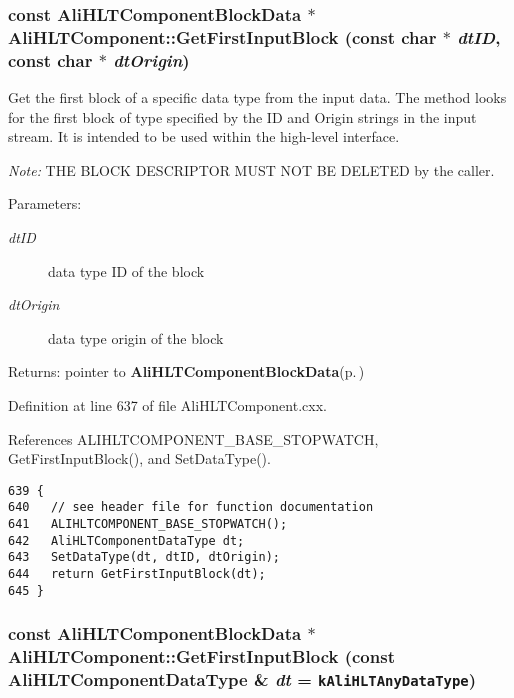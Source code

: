 \subsubsection{\setlength{\rightskip}{0pt plus 5cm}const {\bf Ali\-HLTComponent\-Block\-Data} $\ast$ Ali\-HLTComponent::Get\-First\-Input\-Block (const char $\ast$ {\em dt\-ID}, const char $\ast$ {\em dt\-Origin})\hspace{0.3cm}{\tt  [protected]}}\label{classAliHLTComponent_b19}


Get the first block of a specific data type from the input data. The method looks for the first block of type specified by the ID and Origin strings in the input stream. It is intended to be used within the high-level interface.\par
 {\em Note:\/} THE BLOCK DESCRIPTOR MUST NOT BE DELETED by the caller. \begin{Desc}
\item[Parameters:]
\begin{description}
\item[{\em dt\-ID}]data type ID of the block \item[{\em dt\-Origin}]data type origin of the block \end{description}
\end{Desc}
\begin{Desc}
\item[Returns:]pointer to {\bf Ali\-HLTComponent\-Block\-Data}{\rm (p.\,\pageref{structAliHLTComponentBlockData})} \end{Desc}


Definition at line 637 of file Ali\-HLTComponent.cxx.

References ALIHLTCOMPONENT\_\-BASE\_\-STOPWATCH, Get\-First\-Input\-Block(), and Set\-Data\-Type().

\footnotesize\begin{verbatim}639 {
640   // see header file for function documentation
641   ALIHLTCOMPONENT_BASE_STOPWATCH();
642   AliHLTComponentDataType dt;
643   SetDataType(dt, dtID, dtOrigin);
644   return GetFirstInputBlock(dt);
645 }
\end{verbatim}\normalsize 


\subsubsection{\setlength{\rightskip}{0pt plus 5cm}const {\bf Ali\-HLTComponent\-Block\-Data} $\ast$ Ali\-HLTComponent::Get\-First\-Input\-Block (const {\bf Ali\-HLTComponent\-Data\-Type} \& {\em dt} = {\tt {\bf k\-Ali\-HLTAny\-Data\-Type}})\hspace{0.3cm}{\tt  [protected]}}\label{classAliHLTComponent_b18}


